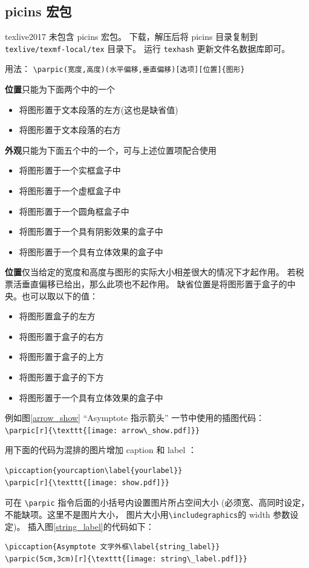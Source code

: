 \documentclass[a4paper,11pt]{article}
\begin{document}
\subsection{picins 宏包}
texlive2017 未包含 picins 宏包。
下载，解压后将 picins 目录复制到 \verb+texlive/texmf-local/tex+ 目录下。
运行 \verb+texhash+ 更新文件名数据库即可。

用法：%
\verb+\parpic(宽度,高度)(水平偏移,垂直偏移)[选项][位置]{图形}+

{\bf 位置}只能为下面两个中的一个
\begin{itemize}
	\item [l] 将图形置于文本段落的左方(这也是缺省值)
	\item [r] 将图形置于文本段落的右方
\end{itemize}

{\bf 外观}只能为下面五个中的一个，可与上述位置项配合使用
\begin{itemize}
	\item [f] 将图形置于一个实框盒子中
	\item [d] 将图形置于一个虚框盒子中
	\item [o] 将图形置于一个圆角框盒子中
	\item [s] 将图形置于一个具有阴影效果的盒子中
	\item [x] 将图形置于一个具有立体效果的盒子中	
\end{itemize}

{\bf 位置}仅当给定的宽度和高度与图形的实际大小相差很大的情况下才起作用。
若税票活垂直偏移已给出，那么此项也不起作用。
缺省位置是将图形置于盒子的中央。也可以取以下的值：
\begin{itemize}
	\item [l] 将图形置盒子的左方
	\item [r] 将图形置于盒子的右方
	\item [t] 将图形置于盒子的上方
	\item [b] 将图形置于盒子的下方
	\item [x] 将图形置于一个具有立体效果的盒子中	
\end{itemize}
例如图\ref{arrow_show} ``Asymptote 指示箭头'' 一节中使用的插图代码：\\
\verb+\parpic[r]{\texttt{[image: arrow\_show.pdf]}}+

用下面的代码为混排的图片增加 caption 和 label ：
\begin{Verbatim}
\piccaption{yourcaption\label{yourlabel}}
\parpic[r]{\texttt{[image: show.pdf]}}
\end{Verbatim}

可在 \verb+\parpic+ 指令后面的小括号内设置图片所占空间大小%
(必须宽、高同时设定，不能缺项。这里不是图片大小，
图片大小用\verb+\includegraphics+的 width 参数设定)。
插入图\ref{string_label}的代码如下：
\begin{Verbatim}
\piccaption{Asymptote 文字外框\label{string_label}}
\parpic(5cm,3cm)[r]{\texttt{[image: string\_label.pdf]}}
\end{Verbatim}
\end{document}
